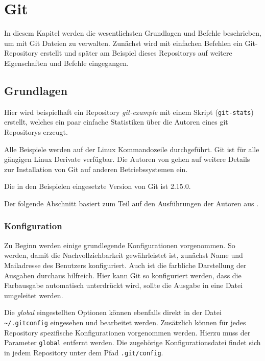 \chapter{Git}\label{cha:git}
In diesem Kapitel werden die wesentlichsten Grundlagen und Befehle
beschrieben, um mit Git Dateien zu verwalten. Zunächst wird mit einfachen
Befehlen ein Git-Repository erstellt und später am Beispiel dieses Repositorys
auf weitere Eigenschaften und Befehle eingegangen.

\section{Grundlagen}\label{gitbasics}
Hier wird beispielhaft ein Repository \textit{git-example} mit einem
Skript (\texttt{git-stats}) erstellt, welches ein paar einfache Statistiken
über die Autoren eines git Repositorys erzeugt.

Alle Beispiele werden auf der Linux Kommandozeile durchgeführt. Git ist für
alle gängigen Linux Derivate verfügbar. Die Autoren von \cite[S.~12-14]{progit}
gehen auf weitere Details zur Installation von Git auf anderen Betriebssystemen
ein.

Die in den Beispielen eingesetzte Version von Git ist 2.15.0.


Der folgende Abschnitt basiert zum Teil auf den Ausführungen der Autoren aus
\cite[S.22-57]{gitosp}.

\subsection{Konfiguration}\label{gitconfig}
Zu Beginn werden einige grundlegende Konfigurationen vorgenommen. So werden,
damit die Nachvollziehbarkeit gewährleistet ist, zunächst Name und Mailadresse
des Benutzers konfiguriert. Auch ist die farbliche Darstellung der Ausgaben
durchaus hilfreich. Hier kann Git so konfiguriert werden, dass die Farbausgabe
automatisch unterdrückt wird, sollte die Ausgabe in eine Datei umgeleitet
werden.


Die \textit{global} eingestellten Optionen können ebenfalls direkt in der Datei
\texttt{\textasciitilde/.gitconfig} eingesehen und bearbeitet werden.
Zusätzlich können für jedes Repository spezifische Konfigurationen vorgenommen
werden. Hierzu muss der Parameter \texttt{\-\-global} entfernt werden. Die
zugehörige Konfigurationsdatei findet sich in jedem Repository unter dem Pfad
\texttt{.git/config}.

